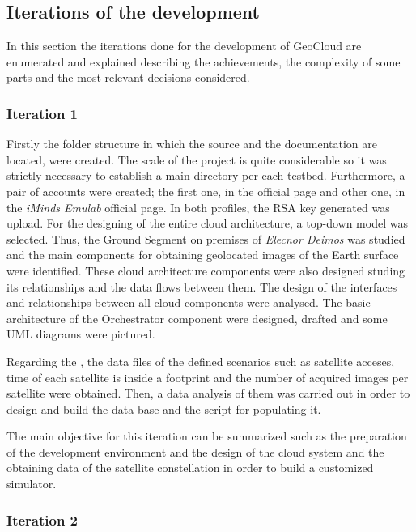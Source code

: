 \subsection{Iterations of the development}

In this section the iterations done for the development of GeoCloud are
enumerated and explained describing the achievements, the complexity of some
parts and the most relevant decisions considered.

\subsubsection{Iteration 1}

Firstly the folder structure in which the source and the documentation are
located, were created. The scale of the project is quite considerable so it was
strictly necessary to establish a main directory per each testbed. Furthermore,
a pair of accounts were created; the first one, in the \bonfire official page
and other one, in the \emph{iMinds Emulab} official page. In both profiles, the
\ac{RSA} key generated was upload.
For the designing of the entire cloud architecture, a top-down model was
selected. Thus, the Ground Segment on premises of \emph{Elecnor Deimos} was
studied and the main components for obtaining geolocated images of the Earth
surface were identified. These cloud architecture components were also designed
studing its relationships and the data flows between them. The design of the
interfaces and relationships between all cloud components were analysed. 
The basic architecture of the Orchestrator component were
designed, drafted and some \ac{UML} diagrams were pictured. 

Regarding the \sss, the data files of the defined scenarios such as satellite acceses,
time of each satellite is inside a footprint and the number of acquired images per
satellite were obtained. Then, a data analysis of them was carried out in order
to design and build the data base and the script for populating it.


The main objective for this iteration can be summarized such as the preparation
of the development environment and the design of the cloud system and the
obtaining data of the satellite constellation in order to build a customized simulator.

\subsubsection{Iteration 2}

